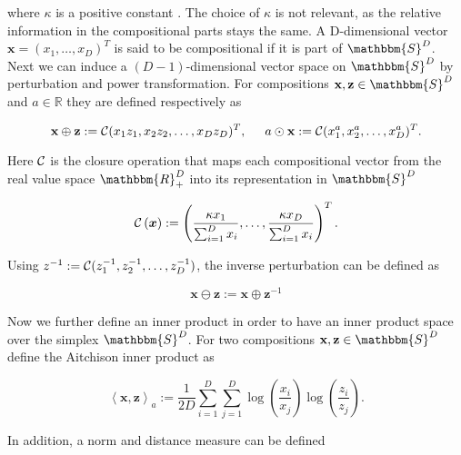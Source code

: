 where $\kappa$ is a positive constant \cite{Kynclova:2015}. The choice of $\kappa$ is not relevant, as the relative information in the compositional parts stays the same.  A D-dimensional vector $\textbf{x} = (x_1,\ldots,x_D)^T$ is said to be compositional if it is part of $\mathbbm{S}^D$. Next we can induce a $(D-1)$-dimensional vector space on $\mathbbm{S}^D$ by perturbation and power transformation. For compositions $\textbf{x},\textbf{z} \in \mathbbm{S}^D$ and $a \in \mathbb{R}$ they are defined respectively as \cite{Kynclova:2015}

\begin{equation*}
\textbf{x}\oplus \textbf{z} := \mathcal{C}(x_1z_1,x_2z_2,\ldots,x_Dz_D)^T, \hspace{0.5cm} a \odot \textbf{x} := \mathcal{C}(x_1^a,x_2^a,\ldots,x_D^a)^T.
\label{eq:Simplex Operationen}
\end{equation*}

Here $\mathcal{C}$ is the closure operation that maps each compositional vector from the real value space $\mathbbm{R}_+^D$ into its representation in $\mathbbm{S}^D$

\begin{equation*}
\mathcal{C} \left(\bm{x}\right) := \left(\frac{\kappa x_1}{\sum_{i=1}^D x_i},\ldots, \frac{\kappa x_D}{\sum_{i=1}^D x_i}\right)^T.
\label{eq:Closure Operation}
\end{equation*}


Using $z^{-1} := \mathcal{C}(z_1^{-1},z_2^{-1},\ldots,z_D^{-1})$, the inverse perturbation can be defined as 

\begin{equation*}
\textbf{x} \ominus \textbf{z} := \textbf{x} \oplus \textbf{z}^{-1}
\label{eq: Inverse Perturbation}
\end{equation*}

Now we further define an inner product in order to have an inner product space over the simplex $\mathbbm{S}^D$. For two compositions $\textbf{x},\textbf{z} \in \mathbbm{S}^D$ define the Aitchison inner product as 

\begin{equation*}
\left\langle \textbf{x},\textbf{z} \right\rangle_a := \frac{1}{2D}\sum_{i=1}^{D}\sum_{j=1}^{D}\log(\frac{x_i}{x_j})\log(\frac{z_i}{z_j}).
\label{eq:Aitchon inner product}
\end{equation*}

In addition, a norm and distance measure can be defined

